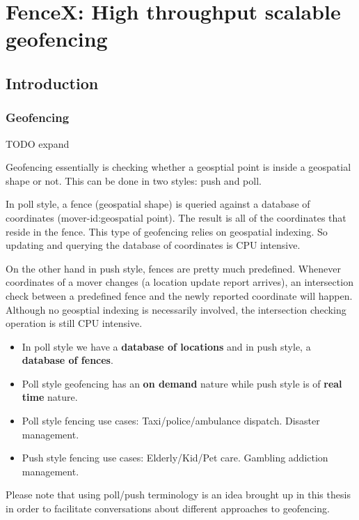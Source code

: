 \documentclass[a4]{report}
\begin{document}
    \part[FenceX]{FenceX: High throughput scalable geofencing}

    \chapter{Introduction}

    \section{Geofencing}
    TODO expand


    Geofencing essentially is checking whether a geosptial point is inside a geospatial shape or not. This can be done in two styles: push and poll.

    In poll style, a fence (geospatial shape) is queried against a database of coordinates (mover-id:geospatial point). The result is all of the coordinates that reside in the fence. This type of geofencing relies on geospatial indexing. So updating and querying the database of coordinates is CPU intensive.

    On the other hand in push style, fences are pretty much predefined. Whenever coordinates of a mover changes (a location update report arrives), an intersection check between a predefined fence and the newly reported coordinate will happen. Although no geosptial indexing is necessarily involved, the intersection checking operation is still CPU intensive.

    \begin{itemize}
        \item In poll style we have a \textbf{database of locations} and in push style, a \textbf{database of fences}.
        \item Poll style geofencing has an \textbf{on demand} nature while push style is of \textbf{real time} nature.
        \item Poll style fencing use cases: Taxi/police/ambulance dispatch. Disaster management.
        \item Push style fencing use cases: Elderly/Kid/Pet care. Gambling addiction management.
    \end{itemize}

    Please note that using poll/push terminology is an idea brought up in this thesis in order to facilitate conversations about different approaches to geofencing.
\end{document}
